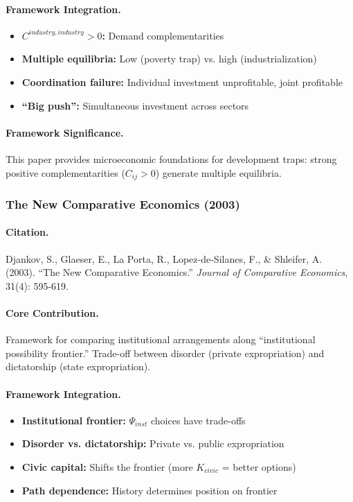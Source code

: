 \documentclass[12pt,a4paper]{article}
\begin{document}
\paragraph{Framework Integration.}
\begin{itemize}
  \item \textbf{$C^{industry,industry} > 0$:} Demand complementarities
  \item \textbf{Multiple equilibria:} Low (poverty trap) vs. high (industrialization)
  \item \textbf{Coordination failure:} Individual investment unprofitable, joint profitable
  \item \textbf{``Big push'':} Simultaneous investment across sectors
\end{itemize}

\paragraph{Framework Significance.}
This paper provides microeconomic foundations for development traps:
strong positive complementarities ($C_{ij} > 0$) generate multiple equilibria.

\subsubsection{The New Comparative Economics (2003)}

\paragraph{Citation.}
Djankov, S., Glaeser, E., La Porta, R., Lopez-de-Silanes, F., \& Shleifer, A. (2003).
``The New Comparative Economics.''
\emph{Journal of Comparative Economics}, 31(4): 595-619.

\paragraph{Core Contribution.}
Framework for comparing institutional arrangements along ``institutional
possibility frontier.'' Trade-off between disorder (private expropriation)
and dictatorship (state expropriation).

\paragraph{Framework Integration.}
\begin{itemize}
  \item \textbf{Institutional frontier:} $\Psi_{inst}$ choices have trade-offs
  \item \textbf{Disorder vs. dictatorship:} Private vs. public expropriation
  \item \textbf{Civic capital:} Shifts the frontier (more $K_{civic}$ = better options)
  \item \textbf{Path dependence:} History determines position on frontier
\end{itemize}
\end{document}
